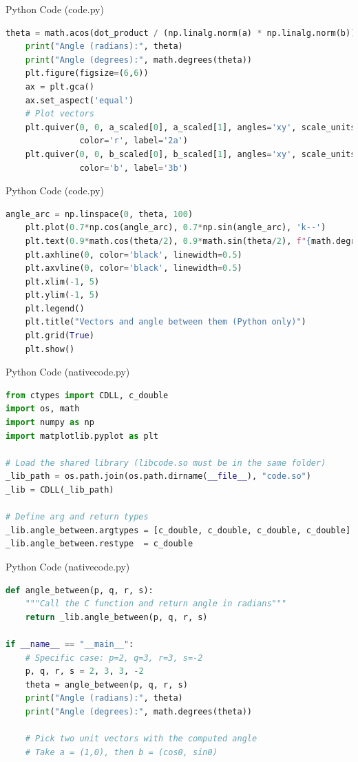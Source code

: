 \documentclass{beamer}
\begin{document}
\begin{frame}[fragile]{Python Code (code.py)}
\begin{lstlisting}[language=Python]
    theta = math.acos(dot_product / (np.linalg.norm(a) * np.linalg.norm(b)))
    print("Angle (radians):", theta)
    print("Angle (degrees):", math.degrees(theta))
    plt.figure(figsize=(6,6))
    ax = plt.gca()
    ax.set_aspect('equal')
    # Plot vectors
    plt.quiver(0, 0, a_scaled[0], a_scaled[1], angles='xy', scale_units='xy', scale=1,
               color='r', label='2a')
    plt.quiver(0, 0, b_scaled[0], b_scaled[1], angles='xy', scale_units='xy', scale=1,
               color='b', label='3b')
\end{lstlisting}
\end{frame}
\begin{frame}[fragile]{Python Code (code.py)}
\begin{lstlisting}[language=Python]
    angle_arc = np.linspace(0, theta, 100)
    plt.plot(0.7*np.cos(angle_arc), 0.7*np.sin(angle_arc), 'k--')
    plt.text(0.9*math.cos(theta/2), 0.9*math.sin(theta/2), f"{math.degrees(theta):.0f}°")
    plt.axhline(0, color='black', linewidth=0.5)
    plt.axvline(0, color='black', linewidth=0.5)
    plt.xlim(-1, 5)
    plt.ylim(-1, 5)
    plt.legend()
    plt.title("Vectors and angle between them (Python only)")
    plt.grid(True)
    plt.show()
\end{lstlisting}
\end{frame}
\begin{frame}[fragile]{Python Code (nativecode.py)}
\begin{lstlisting}[language=Python]
from ctypes import CDLL, c_double
import os, math
import numpy as np
import matplotlib.pyplot as plt

# Load the shared library (libcode.so must be in the same folder)
_lib_path = os.path.join(os.path.dirname(__file__), "code.so")
_lib = CDLL(_lib_path)

# Define arg and return types
_lib.angle_between.argtypes = [c_double, c_double, c_double, c_double]
_lib.angle_between.restype  = c_double
\end{lstlisting}
\end{frame}
\begin{frame}[fragile]{Python Code (nativecode.py)}
\begin{lstlisting}[language=Python]
def angle_between(p, q, r, s):
    """Call the C function and return angle in radians"""
    return _lib.angle_between(p, q, r, s)

if __name__ == "__main__":
    # Specific case: p=2, q=3, r=3, s=-2
    p, q, r, s = 2, 3, 3, -2
    theta = angle_between(p, q, r, s)
    print("Angle (radians):", theta)
    print("Angle (degrees):", math.degrees(theta))

    # Pick two unit vectors with the computed angle
    # Take a = (1,0), then b = (cosθ, sinθ)
\end{lstlisting}
\end{frame}
\end{document}
